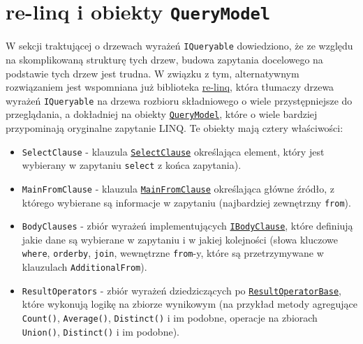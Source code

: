 \section{re-linq i obiekty \texttt{QueryModel}}
W sekcji traktującej o drzewach wyrażeń \texttt{IQueryable} dowiedziono, że ze względu na skomplikowaną strukturę tych drzew, budowa zapytania docelowego na podstawie tych drzew jest trudna. W związku z tym, alternatywnym rozwiązaniem jest wspomniana już biblioteka \href{https://github.com/re-motion/Relinq}{re-linq}, która tłumaczy drzewa wyrażeń \texttt{IQueryable} na drzewa rozbioru składniowego o wiele przystępniejsze do przeglądania, a dokładniej na obiekty \href{https://github.com/re-motion/Relinq/blob/82fdca6a4bfd942bb4a71dd20ab9c5af0aea0541/Core/QueryModel.cs}{\texttt{QueryModel}}, które o wiele bardziej przypominają oryginalne zapytanie LINQ. Te obiekty mają cztery właściwości:

\begin{itemize}
\item \texttt{SelectClause} - klauzula \href{https://github.com/re-motion/Relinq/blob/82fdca6a4bfd942bb4a71dd20ab9c5af0aea0541/Core/Clauses/SelectClause.cs}{\texttt{SelectClause}} określająca element, który jest wybierany w zapytaniu \texttt{select} z końca zapytania).
\item \texttt{MainFromClause} - klauzula \href{https://github.com/re-motion/Relinq/blob/82fdca6a4bfd942bb4a71dd20ab9c5af0aea0541/Core/Clauses/MainFromClause.cs}{\texttt{MainFromClause}} określająca główne źródło, z którego wybierane są informacje w zapytaniu (najbardziej zewnętrzny \texttt{from}).
\item \texttt{BodyClauses} - zbiór wyrażeń implementujących \href{https://github.com/re-motion/Relinq/blob/82fdca6a4bfd942bb4a71dd20ab9c5af0aea0541/Core/Clauses/IBodyClause.cs}{\texttt{IBodyClause}}, które definiują jakie dane są wybierane w zapytaniu i w jakiej kolejności (słowa kluczowe \texttt{where}, \texttt{orderby}, \texttt{join}, wewnętrzne \texttt{from}-y, które są przetrzymywane w klauzulach \texttt{AdditionalFrom}).
\item \texttt{ResultOperators} - zbiór wyrażeń dziedziczących po \href{https://github.com/re-motion/Relinq/blob/82fdca6a4bfd942bb4a71dd20ab9c5af0aea0541/Core/Clauses/ResultOperatorBase.cs}{\texttt{ResultOperatorBase}}, które wykonują logikę na zbiorze wynikowym (na przykład metody agregujące \texttt{Count()}, \texttt{Average()}, \texttt{Distinct()} i im podobne, operacje na zbiorach \texttt{Union()}, \texttt{Distinct()} i im podobne).
\end{itemize}

